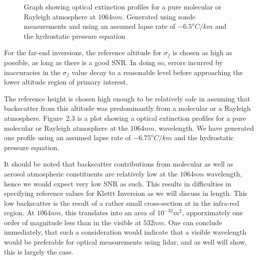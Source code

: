 \begin{figure}
\vspace{5.0in}
\caption{Graph showing optical extinction
profiles for a pure molecular or Rayleigh atmosphere at
$1064nm$. Generated using sonde measurements \SOLID and using 
an assumed lapse rate of ${-6.5^{o}}{C/km}$ and the
hydrostatic pressure equation \DASHED}
\end{figure}

For the far-end inversions, the reference 
altitude for $\sigma_{f}$ is 
chosen as high as possible, as long as there is a good SNR.
In doing so, errors incurred by inaccuracies in the $\sigma_{f}$ value 
decay to a reasonable level before approaching the lower 
altitude region of primary interest.


The reference height is chosen high enough to be relatively safe in assuming
that backscatter from this altitude  was predominantly from a molecular
or a Rayleigh atmosphere. Figure~{2.3} is a plot showing a optical extinction
profiles for a pure molecular or Rayleigh atmosphere at the $1064nm$. 
wavelength. We have generated
one profile using an assumed lapse rate of ${-6.75^{o}}{C/km}$ and the
hydrostatic pressure equation.

It should be noted that backscatter contributions from molecular as well as
aerosol atmospheric constituents are relatively low at the $1064nm$
wavelength, hence we would expect very low SNR as such. This results
in difficulties in specifying reference values for Klettt Inversion as
we will discuss in length. This low backscatter is the result of a
rather small cross-section at in the infra-red region. At $1064nm$,
this translates into an area of ${10^{-32}}{m^2}$, apporximately
one order of magnitude less than in the visible at $532nm$. 
One can conclude immediately, that such a consideration would
indicate that a visible wavelength would be preferable for
optical measurements using lidar, and as well will show, this
is largely the case.


